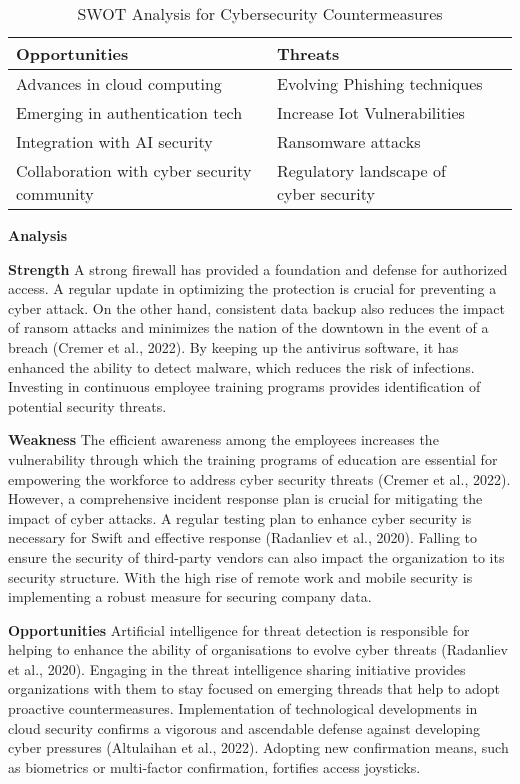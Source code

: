 \begin{table}[h!]
    \centering
    \caption{SWOT Analysis for Cybersecurity Countermeasures}
    \label{tab:_ex_tab}
    \begin{tabular}{llr}     
    \toprule
    \cmidrule(r){1-2}
    Opportunities    &  Threats   \\
    \midrule
    Advances in cloud computing   & Evolving Phishing techniques  \\
    Emerging in authentication tech       &Increase Iot Vulnerabilities   \\
    Integration with AI security          &Ransomware attacks     \\
    Collaboration with cyber security community&Regulatory landscape of cyber security      \\
        \bottomrule
    \end{tabular}
\end{table}



\textbf{Analysis}

\textbf{Strength}
A strong firewall has provided a foundation and defense for authorized access. A regular update in optimizing the protection is crucial for preventing a cyber attack. On the other hand, consistent data backup also reduces the impact of ransom attacks and minimizes the nation of the downtown in the event of a breach (Cremer et al., 2022). By keeping up the antivirus software, it has enhanced the ability to detect malware, which reduces the risk of infections. Investing in continuous employee training programs provides identification of potential security threats.

\textbf{Weakness}
The efficient awareness among the employees increases the vulnerability through which the training programs of education are essential for empowering the workforce to address cyber security threats (Cremer et al., 2022). However, a comprehensive incident response plan is crucial for mitigating the impact of cyber attacks. A regular testing plan to enhance cyber security is necessary for Swift and effective response (Radanliev et al., 2020). Falling to ensure the security of third-party vendors can also impact the organization to its security structure. With the high rise of remote work and mobile security is implementing a robust measure for securing company data. 

\textbf{Opportunities}
 Artificial intelligence for threat detection is responsible for helping to enhance the ability of organisations to evolve cyber threats (Radanliev et al., 2020). Engaging in the threat intelligence sharing initiative provides organizations with them to stay focused on emerging threads that help to adopt proactive countermeasures. Implementation of technological developments in cloud security confirms a vigorous and ascendable defense against developing cyber pressures (Altulaihan et al., 2022). Adopting new confirmation means, such as biometrics or multi-factor confirmation, fortifies access joysticks.

